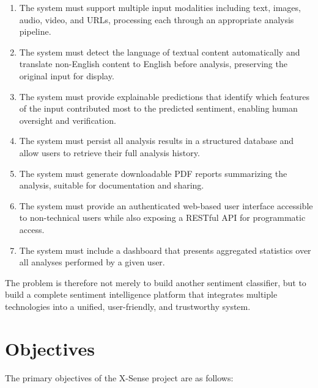 \documentclass[12pt, a4paper]{report}
\begin{document}
\begin{enumerate}[noitemsep, leftmargin=2em]
    \item The system must support multiple input modalities including text, images, audio, video, and URLs, processing each through an appropriate analysis pipeline.
    \item The system must detect the language of textual content automatically and translate non-English content to English before analysis, preserving the original input for display.
    \item The system must provide explainable predictions that identify which features of the input contributed most to the predicted sentiment, enabling human oversight and verification.
    \item The system must persist all analysis results in a structured database and allow users to retrieve their full analysis history.
    \item The system must generate downloadable PDF reports summarizing the analysis, suitable for documentation and sharing.
    \item The system must provide an authenticated web-based user interface accessible to non-technical users while also exposing a RESTful API for programmatic access.
    \item The system must include a dashboard that presents aggregated statistics over all analyses performed by a given user.
\end{enumerate}

The problem is therefore not merely to build another sentiment classifier, but to build a complete sentiment intelligence platform that integrates multiple technologies into a unified, user-friendly, and trustworthy system.

\section{Objectives}

The primary objectives of the X-Sense project are as follows:
\end{document}
